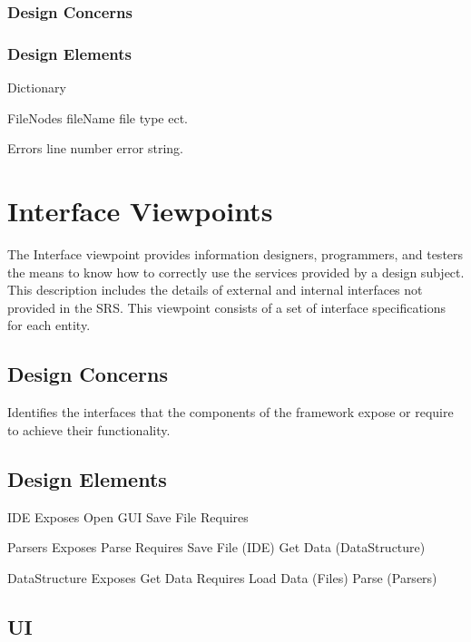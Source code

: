 \documentclass[letterpaper,10pt,titlepage,draftclsnofoot,onecolumn,onesided] {IEEEtran}
\begin{document}
\subsubsection{Design Concerns}
\subsubsection{Design Elements}
	Dictionary
	
	FileNodes
		fileName
		file type ect.
		
	Errors
		line number
		error string.

	

		
		
		



\section{Interface Viewpoints}
The Interface viewpoint provides information designers, programmers, and testers the means to know how
to correctly use the services provided by a design subject. This description includes the details of external
and internal interfaces not provided in the SRS. This viewpoint consists of a set of interface specifications
for each entity. 
\subsection{Design Concerns}
Identifies the interfaces that the components of the framework expose or require to achieve their
functionality. 
\subsection{Design Elements}


	IDE
		Exposes
			Open GUI
			Save File
		Requires
	
	Parsers
		Exposes
			Parse 
		Requires
			Save File (IDE)
			Get Data (DataStructure)
	
	DataStructure
		Exposes
			Get Data
		Requires
			Load Data (Files)
			Parse (Parsers)
	
\subsection{UI}
\end{document}
